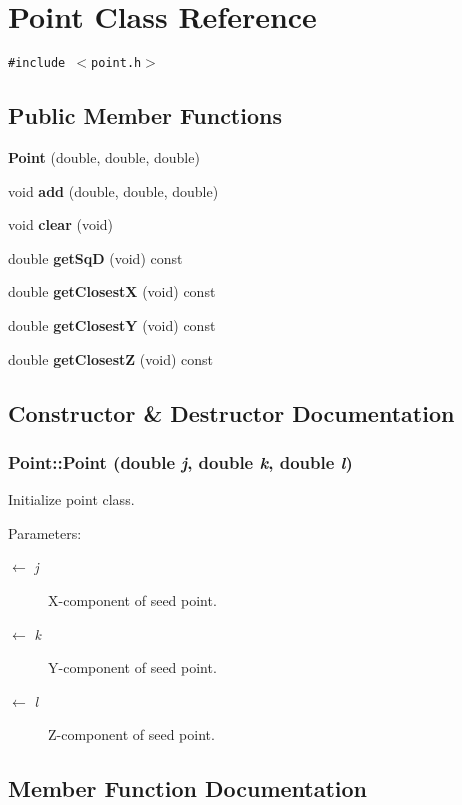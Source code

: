 \section{Point Class Reference}
\label{classPoint}
{\tt \#include $<$point.h$>$}

\subsection*{Public Member Functions}
\begin{CompactItemize}
\item 
{\bf Point} (double, double, double)
\item 
void {\bf add} (double, double, double)
\item 
void {\bf clear} (void)
\item 
double {\bf get\-Sq\-D} (void) const
\item 
double {\bf get\-Closest\-X} (void) const
\item 
double {\bf get\-Closest\-Y} (void) const
\item 
double {\bf get\-Closest\-Z} (void) const
\end{CompactItemize}


\subsection{Constructor \& Destructor Documentation}
\subsubsection{\setlength{\rightskip}{0pt plus 5cm}Point::Point (double {\em j}, double {\em k}, double {\em l})}\label{classPoint_a20b22a6c0530d1c52ad963eb36fe536}


Initialize point class. \begin{Desc}
\item[Parameters:]
\begin{description}
\item[\mbox{$\leftarrow$} {\em j}]X-component of seed point. \item[\mbox{$\leftarrow$} {\em k}]Y-component of seed point. \item[\mbox{$\leftarrow$} {\em l}]Z-component of seed point. \end{description}
\end{Desc}


\subsection{Member Function Documentation}
